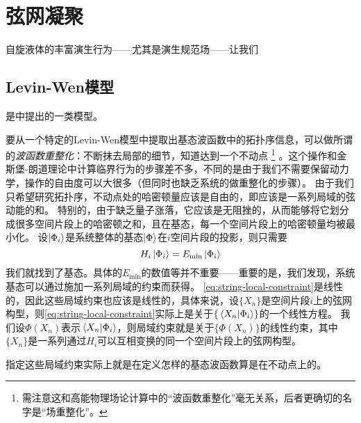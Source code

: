 \chapter{弦网凝聚}

自旋液体的丰富演生行为——尤其是演生规范场——让我们

\section{Levin-Wen模型}

是\cite{Levin_2005}中提出的一类模型。

要从一个特定的Levin-Wen模型中提取出基态波函数中的拓扑序信息，可以做所谓的\emph{波函数重整化}：不断抹去局部的细节，知道达到一个不动点%
\footnote{
    需注意这和高能物理场论计算中的“波函数重整化”毫无关系，后者更确切的名字是“场重整化”。
}%
。这个操作和金斯堡-朗道理论中计算临界行为的步骤差不多，不同的是由于我们不需要保留动力学，操作的自由度可以大很多（但同时也缺乏系统的做重整化的步骤）。
由于我们只希望研究拓扑序，不动点处的哈密顿量应该是自由的，即应该是一系列局域的弦动能的和。
特别的，由于缺乏量子涨落，它应该是无阻挫的，从而能够将它划分成很多空间片段上的哈密顿之和，且在基态，每一个空间片段上的哈密顿量均被最小化。
设$\ket{\Phi_i}$是系统整体的基态$\ket{\Phi}$在$i$空间片段的投影，则只需要
\begin{equation}
    H_i \ket{\Phi_i} = E_\text{min} \ket{\Phi_i}
    \label{eq:string-local-constraint}
\end{equation}
我们就找到了基态。具体的$E_\text{min}$的数值等并不重要——重要的是，我们发现，系统基态可以通过施加一系列局域的约束而获得。
\eqref{eq:string-local-constraint}是线性的，因此这些局域约束也应该是线性的，具体来说，设$\{X_n\}$是空间片段$i$上的弦网构型，则\eqref{eq:string-local-constraint}实际上是关于$\{ \braket*{X_n}{\Phi_i} \}$的一个线性方程。
我们设$\Phi(X_n)$表示$\braket*{X_n}{\Phi_i}$，则局域约束就是关于$\{\Phi(X_n)\}$的线性约束，其中$\{X_n\}$是一系列通过$H_i$可以互相变换的同一个空间片段上的弦网构型。

指定这些局域约束实际上就是在定义怎样的基态波函数算是在不动点上的。
